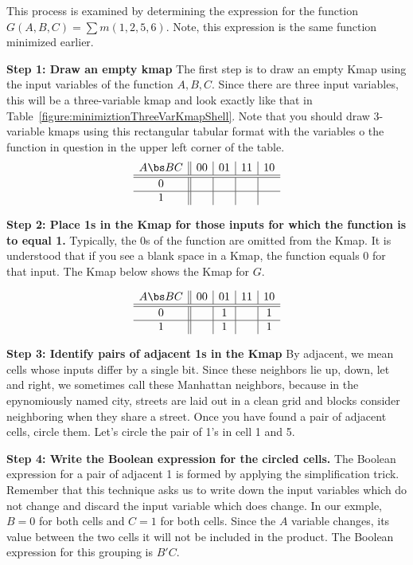 \begin{process:minimizationKmap}
\label{process:minimizationKmap}

This process is examined by 
determining the \SOPmin expression for the function 
$G(A,B,C)=\sum m(1,2,5,6)$.  Note, this expression is the
same function minimized earlier.  

\textbf{Step 1: Draw an empty kmap}
The first step is to draw an empty Kmap using the input variables of the function $A,B,C$.
Since there are three input variables, this will be a three-variable kmap and 
look exactly like that in Table~\ref{figure:minimiztionThreeVarKmapShell}.
Note that you should draw  3-variable kmaps using this rectangular tabular format with
the variables o the function in question in the upper left corner of the table.
$$ \begin{array} {c||c|c|c|c}
	A \bs BC & 00 & 01 & 11 & 10 \\ \hline \hline
	0        &    &    &    &    \\ \hline
	1        &    &    &    &    \\ 
\end{array} $$


\textbf{Step 2: Place 1s in the Kmap for those inputs for which the function is to equal 1.}
Typically, the 0s of the function are omitted from the Kmap.  It is understood that if
you see a blank space in a Kmap, the function equals 0 for that input.  The Kmap
below shows the Kmap for $G$.

$$ \begin{array} {c||c|c|c|c}
	A \bs BC & 00 & 01 & 11 & 10 \\ \hline \hline
	0        &    & 1  &    & 1  \\ \hline
	1        &    & 1  &    & 1  \\ 
\end{array} $$

\textbf{Step 3: Identify pairs of adjacent 1s in the Kmap}
By adjacent, we mean cells whose inputs differ by a single
bit.  Since these neighbors lie up, down, let and right, we
sometimes call these Manhattan neighbors, because in the
epynomiously named city, streets are laid out in a clean grid 
and blocks consider neighboring when they share a street.
Once you have found a pair of adjacent cells, circle them.
Let's circle the pair of 1's in cell 1 and 5.

\textbf{Step 4: Write the Boolean expression for the  circled cells.}
The Boolean expression for a pair of adjacent 1 is formed by applying
the simplification trick.  Remember that this
technique asks us to write down the input variables which do 
not change and discard the input variable which does change.
In our exmple, $B=0$ for both cells and $C=1$ for 
both cells.  Since the $A$ variable changes, its value between
the two cells it will not be included in the product.  The 
Boolean expression for this grouping is $B'C$.  


\end{process:minimizationKmap}
